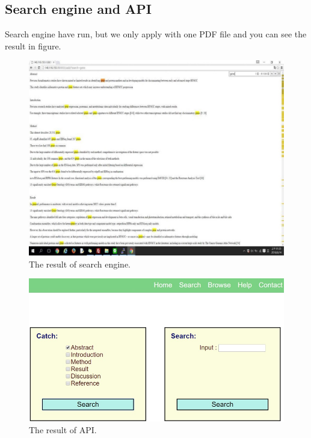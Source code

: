 	\subsection*{Search engine and API}
	Search engine have run, but we only apply with one PDF file and you can see the result in figure. 

	\begin{figure}[tbh]
		\begin{center}
			\includegraphics[width=\columnwidth]{Union_Result_Chart_Search engine}
		\end{center}
		\caption{The result of search engine.}
	\end{figure}

	\begin{figure}[tbh]
		\begin{center}
			\includegraphics[width=\columnwidth]{Union_Result_Chart_API}
		\end{center}
		\caption{The result of API.}
	\end{figure}

